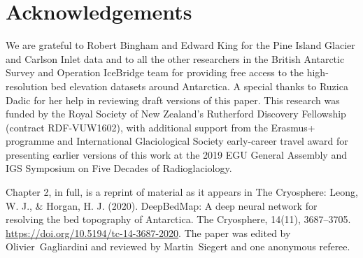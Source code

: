 
\section{Acknowledgements}

We are grateful to Robert Bingham and Edward King for the Pine Island Glacier and Carlson Inlet data and to all the other researchers in the British Antarctic Survey and Operation IceBridge team for providing free access to the high-resolution bed elevation datasets around Antarctica.
A special thanks to Ruzica Dadic for her help in reviewing draft versions of this paper.
This research was funded by the Royal Society of New Zealand's Rutherford Discovery Fellowship (contract RDF-VUW1602), with additional support from the Erasmus+ programme and International Glaciological Society early-career travel award for presenting earlier versions of this work at the 2019 EGU General Assembly and IGS Symposium on Five Decades of Radioglaciology.

Chapter 2, in full, is a reprint of material as it appears in The Cryosphere:
Leong, W. J., \& Horgan, H. J. (2020). DeepBedMap: A deep neural network for resolving the bed topography of Antarctica. The Cryosphere, 14(11), 3687–3705. \url{https://doi.org/10.5194/tc-14-3687-2020}.
The paper was edited by Olivier~Gagliardini and reviewed by Martin~Siegert and one anonymous referee.
